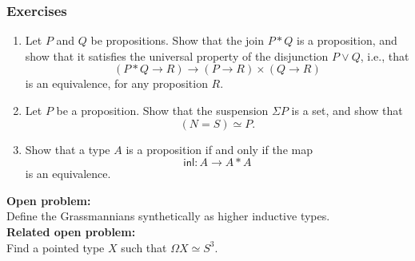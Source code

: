 \documentclass[handout]{beamer}
\newcommand{\sphere}[1]{S^{#1}}
\begin{document}
\begin{frame}
  \frametitle{Exercises}
  \begin{enumerate}
  \item Let $P$ and $Q$ be propositions. Show that the join $P\ast Q$ is a proposition, and show that it satisfies the universal property of the disjunction $P\vee Q$, i.e., that
    \begin{equation*}
      (P\ast Q\to R)\to (P\to R)\times(Q\to R)
    \end{equation*}
    is an equivalence, for any proposition $R$.
  \item Let $P$ be a proposition. Show that the suspension $\Sigma P$ is a set, and show that
    \begin{equation*}
      (N=S)\simeq P.
    \end{equation*}
  \item Show that a type $A$ is a proposition if and only if the map
    \begin{equation*}
      \mathsf{inl} : A \to A\ast A
    \end{equation*}
    is an equivalence.
  \end{enumerate}
\end{frame}

\begin{frame}
  \textbf{Open problem:}\\
  Define the Grassmannians synthetically as higher inductive types.\\[\baselineskip]
  \textbf{Related open problem:}\\
  Find a pointed type $X$ such that $\Omega X\simeq \sphere{3}$.
\end{frame}
\end{document}
